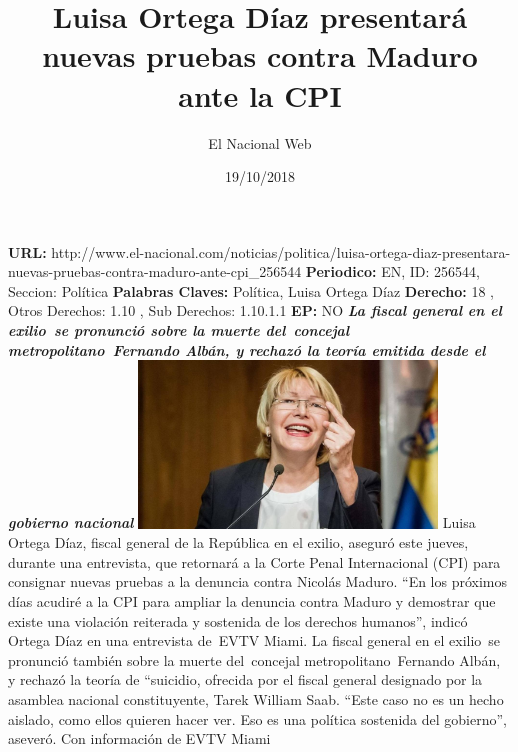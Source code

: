 \documentclass{article}%
\title{\textbf{Luisa Ortega Díaz presentará nuevas pruebas contra Maduro ante la CPI}}%
\author{El Nacional Web}%
\date{19/10/2018}%
\begin{document}
%
\normalsize%
\maketitle%
\textbf{URL: }%
http://www.el{-}nacional.com/noticias/politica/luisa{-}ortega{-}diaz{-}presentara{-}nuevas{-}pruebas{-}contra{-}maduro{-}ante{-}cpi\_256544\newline%
%
\textbf{Periodico: }%
EN, %
ID: %
256544, %
Seccion: %
Política\newline%
%
\textbf{Palabras Claves: }%
Política, Luisa Ortega Díaz\newline%
%
\textbf{Derecho: }%
18%
, Otros Derechos: %
1.10%
, Sub Derechos: %
1.10.1.1%
\newline%
%
\textbf{EP: }%
NO\newline%
\newline%
%
\textbf{\textit{La fiscal general en el exilio~se pronunció sobre la muerte del~concejal metropolitano~Fernando Albán, y rechazó la teoría emitida desde el gobierno nacional}}%
\newline%
\newline%
%
\includegraphics[width=300px]{123.jpg}%
\newline%
%
Luisa Ortega Díaz, fiscal general de la República en el exilio, aseguró este jueves, durante una entrevista, que retornará a la Corte Penal Internacional (CPI) para consignar nuevas pruebas a la denuncia contra Nicolás Maduro.%
\newline%
%
“En los próximos días acudiré a la CPI para ampliar la denuncia contra Maduro y demostrar que existe una violación reiterada y sostenida de los derechos humanos”, indicó Ortega Díaz en una entrevista de~EVTV Miami.%
\newline%
%
La fiscal general en el exilio~se pronunció también sobre la muerte del~concejal metropolitano~Fernando Albán, y rechazó la teoría de “suicidio, ofrecida por el fiscal general designado por la asamblea nacional constituyente, Tarek William Saab.%
\newline%
%
“Este caso no es un hecho aislado, como ellos quieren hacer ver. Eso es una política sostenida del gobierno”, aseveró.%
\newline%
%
Con información de EVTV Miami%
\newline%
%
\end{document}

